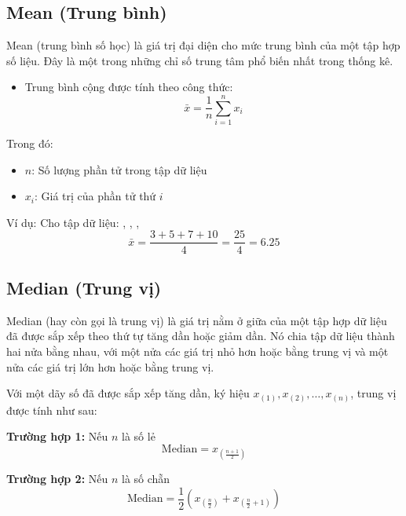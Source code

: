\subsection {Mean (Trung bình)}
\label{stat:mean}
Mean (trung bình số học) là giá trị đại diện cho mức trung bình của một tập hợp số liệu. Đây là một trong những chỉ số trung tâm phổ biến nhất trong thống kê.

\begin{itemize}
    \item Trung bình cộng được tính theo công thức:
    \begin{equation}
        \label{eq:Mean}
        \bar{x} = \frac{1}{n} \sum_{i=1}^{n} x_i
    \end{equation}
\end{itemize}

Trong đó:
\begin{itemize}[noitemsep, topsep=0pt]
    \item $n$: Số lượng phần tử trong tập dữ liệu
    \item $x_i$: Giá trị của phần tử thứ $i$
\end{itemize}

Ví dụ:
\vspace{0.5em}
Cho tập dữ liệu: , , , 
\[
    \bar{x} = \frac{3 + 5 + 7 + 10}{4} = \frac{25}{4} = 6.25
\]

\subsection {Median (Trung vị)}
\label{stat:med}
Median (hay còn gọi là trung vị) là giá trị nằm ở giữa của một tập hợp dữ liệu đã được sắp xếp theo thứ tự tăng dần hoặc giảm dần. Nó chia tập dữ liệu thành hai nửa bằng nhau, với một nửa các giá trị nhỏ hơn hoặc bằng trung vị và một nửa các giá trị lớn hơn hoặc bằng trung vị. 

Với một dãy số đã được sắp xếp tăng dần, ký hiệu \( x_{(1)}, x_{(2)}, \ldots, x_{(n)} \), trung vị được tính như sau:

\textbf{Trường hợp 1:} Nếu \( n \) là số lẻ
\begin{equation}
\label{eq:median_1}
\text{Median} = x_{\left( \frac{n+1}{2} \right)}
\end{equation}

\textbf{Trường hợp 2:} Nếu \( n \) là số chẵn
\begin{equation}
\label{eq:median_0}
\text{Median} = \frac{1}{2} \left( x_{\left( \frac{n}{2} \right)} + x_{\left( \frac{n}{2} + 1 \right)} \right)
\end{equation}


